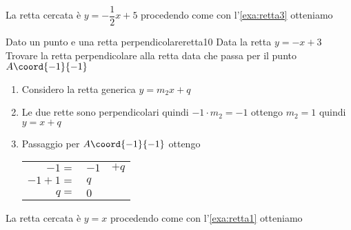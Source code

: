 La retta cercata è $y=-\dfrac{1}{2}x+5$ procedendo come con l'\cref{exa:retta3}
otteniamo
\begin{center}
	
	\label{fig:disegnoretta9}
\end{center}
\begin{esempiot}{Dato un punto e una retta perpendicolare}{retta10}
	Data la retta $y=-x+3$ Trovare la retta perpendicolare alla retta data che  passa per il punto	$A\coord{-1}{-1}$
\end{esempiot}
\begin{enumerate}
	\item Considero la retta generica $y=m_2x+q$
	\item Le due rette sono perpendicolari quindi $-1\cdot m_2=-1$ ottengo $m_2=1$ quindi $y=x+q$
	\item Passaggio per $A\coord{-1}{-1}$ ottengo 
	\begin{tabular}{rll}
		$-1=$&$-1$&$+q$\\
		$-1+1=$&$q$\\
		$q=$&$0$\\
	\end{tabular}
\end{enumerate}

La retta cercata è $y=x$ procedendo come con l'\cref{exa:retta1}
otteniamo
\begin{center}
	
	\label{fig:disegnoretta10}
\end{center}
